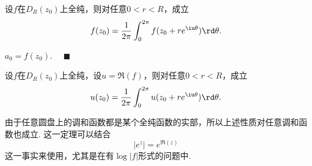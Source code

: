   \begin{cor}[中值]
    \label{cor: 中值}
    设$f$在$D_R(z_0)$上全纯，则对任意$0<r<R$，成立
    \[
      f(z_0) = \frac{1}{2\pi}\int_0^{2\pi}f(z_0+re^{\iu\theta})\rd\theta.
    \]
  \end{cor}
  \proof
    $a_0 = f(z_0)$. $\quad\blacksquare$

  \begin{cor}
    \label{cor: 全纯、实部}
    设$f$在$D_R(z_0)$上全纯，设$u=\Re(f)$，则对任意$0<r<R$，成立
    \[
      u(z_0) = \frac{1}{2\pi}\int_0^{2\pi}u(z_0+re^{\iu\theta})\rd\theta.
    \]
  \end{cor}
  \remark
    由于任意圆盘上的调和函数都是某个全纯函数的实部，所以上述性质对任意调和函数也成立.
    这一定理可以结合
    \[
      |e^z| = e^{\Re(z)}
    \]
    这一事实来使用，尤其是在有$\log|f|$形式的问题中.

